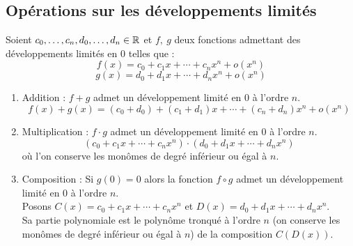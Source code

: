 \subsection{Opérations sur les développements limités}
\begin{proposition}
    Soient $c_0, \ldots, c_n, d_0, \ldots, d_n \in \mathbb{R}$ et $f,\ g$ deux fonctions admettant des développements limités en 0 telles que :
    \[ f(x) = c_0 + c_1x + \cdots + c_n x^n + o(x^n) \]
    \[ g(x) = d_0 + d_1x + \cdots + d_n x^n + o(x^n) \]
    \begin{enumerate}
        \item Addition : $f + g$ admet un développement limité en 0 à l'ordre $n$.
        \[ f(x) + g(x) = (c_0 + d_0) + (c_1 + d_1)x + \cdots + (c_n + d_n) x^n + o(x^n) \]
        \item Multiplication : $f \cdot g$ admet un développement limité en 0 à l'ordre $n$.
        \[ (c_0 + c_1 x + \cdots + c_n x^n) \cdot (d_0 + d_1 x + \cdots + d_n x^n) \]
        où l'on conserve les monômes de degré inférieur ou égal à $n$.
        \item Composition : Si $g(0) = 0$ alors la fonction $f \circ g$ admet un développement limité en 0 à l'ordre $n$.\\
        Posons $C(x) = c_0 + c_1x + \cdots + c_n x^n$ et $D(x) = d_0 + d_1x + \cdots + d_n x^n$.\\
        Sa partie polynomiale est le polynôme tronqué à l'ordre $n$ (on conserve les monômes de degré inférieur ou égal à $n$) de la composition $C(D(x))$. 
    \end{enumerate}
\end{proposition}
